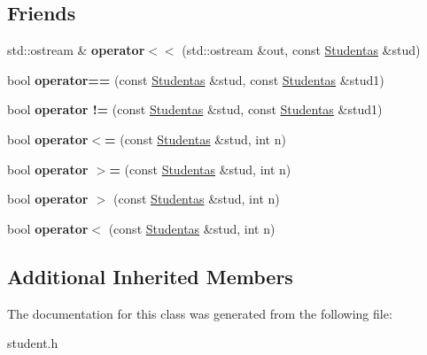 \subsection*{Friends}
\begin{DoxyCompactItemize}
\item 
\mbox{\label{class_studentas_a892920a3627aed9e716ebc73ef53dade}} 
std\+::ostream \& {\bfseries operator$<$$<$} (std\+::ostream \&out, const \mbox{\hyperlink{class_studentas}{Studentas}} \&stud)
\item 
\mbox{\label{class_studentas_a0f003139866d3153a78dbed86d1ade94}} 
bool {\bfseries operator==} (const \mbox{\hyperlink{class_studentas}{Studentas}} \&stud, const \mbox{\hyperlink{class_studentas}{Studentas}} \&stud1)
\item 
\mbox{\label{class_studentas_a9611085ba0c836938c5cd3293b9f98e9}} 
bool {\bfseries operator !=} (const \mbox{\hyperlink{class_studentas}{Studentas}} \&stud, const \mbox{\hyperlink{class_studentas}{Studentas}} \&stud1)
\item 
\mbox{\label{class_studentas_ad65a5e5b2fe7cb653dbd67779dd5bbdc}} 
bool {\bfseries operator$<$=} (const \mbox{\hyperlink{class_studentas}{Studentas}} \&stud, int n)
\item 
\mbox{\label{class_studentas_a55fd16be1a2e37268ceeac71867398b4}} 
bool {\bfseries operator $>$=} (const \mbox{\hyperlink{class_studentas}{Studentas}} \&stud, int n)
\item 
\mbox{\label{class_studentas_a34d0ff4939924d3dd9044146bc343e30}} 
bool {\bfseries operator $>$} (const \mbox{\hyperlink{class_studentas}{Studentas}} \&stud, int n)
\item 
\mbox{\label{class_studentas_a3cebed880c2db8a66963d519d18d3360}} 
bool {\bfseries operator$<$} (const \mbox{\hyperlink{class_studentas}{Studentas}} \&stud, int n)
\end{DoxyCompactItemize}
\subsection*{Additional Inherited Members}


The documentation for this class was generated from the following file\+:\begin{DoxyCompactItemize}
\item 
student.\+h\end{DoxyCompactItemize}
